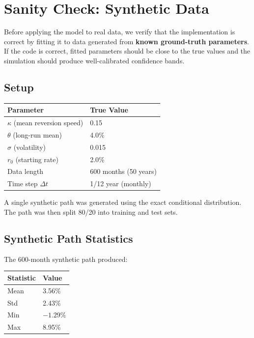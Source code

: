 \documentclass[11pt, letterpaper]{article}
\begin{document}
\section{Sanity Check: Synthetic Data}

Before applying the model to real data, we verify that the implementation is
correct by fitting it to data generated from \textbf{known ground-truth
parameters}. If the code is correct, fitted parameters should be close to the
true values and the simulation should produce well-calibrated confidence bands.

\subsection{Setup}

\begin{center}
\begin{tabular}{@{}L{6cm}R{4cm}@{}}
  \toprule
  \textbf{Parameter} & \textbf{True Value} \\
  \midrule
  $\kappa$ (mean reversion speed) & 0.15 \\
  $\theta$ (long-run mean)        & 4.0\% \\
  $\sigma$ (volatility)           & 0.015 \\
  $r_0$ (starting rate)           & 2.0\% \\
  Data length                     & 600 months (50 years) \\
  Time step $\Delta t$            & 1/12 year (monthly) \\
  \bottomrule
\end{tabular}
\end{center}

A single synthetic path was generated using the exact conditional distribution.
The path was then split 80/20 into training and test sets.

\subsection{Synthetic Path Statistics}

The 600-month synthetic path produced:

\begin{center}
\begin{tabular}{@{}L{4cm}R{3cm}@{}}
  \toprule
  \textbf{Statistic} & \textbf{Value} \\
  \midrule
  Mean & 3.56\% \\
  Std  & 2.43\% \\
  Min  & $-1.29\%$ \\
  Max  & 8.95\% \\
  \bottomrule
\end{tabular}
\end{center}
\end{document}
